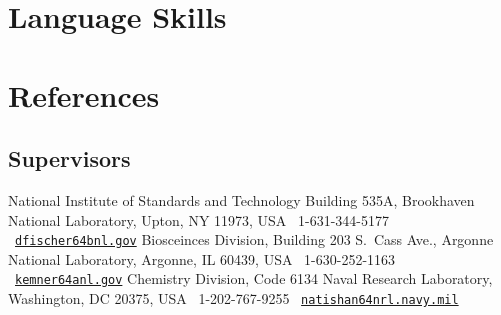 \documentclass[11pt]{moderncv}
\begin{document}


\section{Language Skills}

\section{References}
\subsection{Supervisors}
%
{National Institute of Standards and Technology\newline
  Building 535A, Brookhaven National Laboratory, Upton, NY 11973, USA\newline
  \phonesymbol\ 1-631-344-5177\quad
  \emailsymbol\ \href{mailto:dfischer@bnl.gov}{\footnotesize\texttt{dfischer\char64bnl.gov}}}
%
{Biosceinces Division, Building 203 S.\ Cass Ave., Argonne National Laboratory, Argonne, IL 60439, USA\newline
  \phonesymbol\ 1-630-252-1163\quad
  \emailsymbol\ \href{mailto:kemner@anl.gov}{\footnotesize\texttt{kemner\char64anl.gov}}}
%
{Chemistry Division, Code 6134\newline
  Naval Research Laboratory, Washington, DC 20375, USA\newline
  \phonesymbol\ 1-202-767-9255\quad
  \emailsymbol\ \href{mailto:natishan@nrl.navy.mil}{\footnotesize\texttt{natishan\char64nrl.navy.mil}}}
\end{document}
